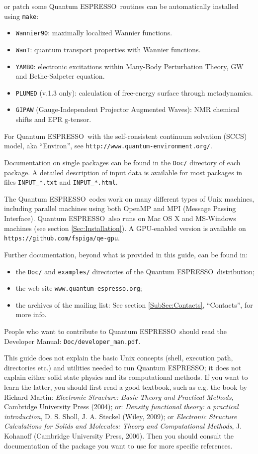 \documentclass[12pt,a4paper]{article}
\def\qe{{\sc Quantum ESPRESSO}}
\begin{document}
or patch some \qe\ routines can be automatically installed using
\texttt{make}:
\begin{itemize}
\item \texttt{Wannier90}:
      maximally localized Wannier functions.
\item \texttt{WanT}:
      quantum transport properties with Wannier functions.
\item \texttt{YAMBO}:
      electronic excitations within Many-Body Perturbation Theory,
      GW and Bethe-Salpeter equation.
\item \texttt{PLUMED} (v.1.3 only):
      calculation of free-energy surface through metadynamics.
\item \texttt{GIPAW} (Gauge-Independent Projector Augmented Waves):
      NMR chemical shifts and EPR g-tensor.
\end{itemize}
For \qe\ with the self-consistent continuum solvation (SCCS) model,
aka ``Environ'', see \texttt{http://www.quantum-environment.org/}.

Documentation on single packages can be found in the \texttt{Doc/}
directory of each package. A detailed description of input
data is available for most packages in files \texttt{INPUT\_*.txt} and
\texttt{INPUT\_*.html}.

The \qe\ codes work on many different types of Unix machines,
including parallel machines using both OpenMP and MPI
(Message Passing Interface).
\qe\ also runs on Mac OS X and MS-Windows machines
(see section \ref{Sec:Installation}). A GPU-enabled version is
available on \texttt{https://github.com/fspiga/qe-gpu}.

Further documentation, beyond what is provided in this guide, can be found in:
\begin{itemize}
\item the \texttt{Doc/} and \texttt{examples/} directories
  of the \qe\ distribution;
  \item the web site \texttt{www.quantum-espresso.org};
  \item the archives of the  mailing list:
   See section \ref{SubSec:Contacts}, ``Contacts'', for more info.
\end{itemize}
People who want to contribute to \qe\ should read the
Developer Manual: \texttt{Doc/developer\_man.pdf}.

This guide does not explain the basic Unix concepts (shell, execution
path, directories etc.) and utilities needed to run \qe; it does not
explain either solid state physics and its computational methods.
If you want to learn the latter, you should first read a good textbook,
such as e.g. the book by Richard Martin:
{\em Electronic Structure: Basic Theory and Practical Methods},
Cambridge University Press (2004); or:
{\em Density functional theory: a practical introduction},
D. S. Sholl, J. A. Steckel (Wiley, 2009); or
{\em Electronic Structure Calculations for Solids and Molecules:
Theory and Computational Methods},
J. Kohanoff (Cambridge University Press, 2006). Then you should consult
the documentation of the package you want to use for more specific references.
\end{document}
